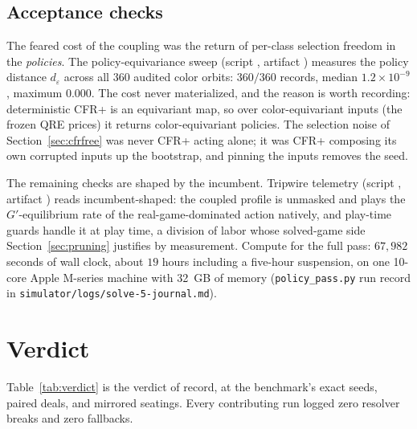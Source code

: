 \documentclass[11pt]{article}
\theoremstyle{plain}
\theoremstyle{definition}
\theoremstyle{remark}
\newcommand{\code}[1]{\texttt{\small #1}}
\newcommand{\gp}{\ensuremath{G'}}
\newcommand{\deps}{\ensuremath{d_\varepsilon}}
\begin{document}
\subsection{Acceptance checks}

The feared cost of the coupling was the return of per-class selection
freedom in the \emph{policies}. The policy-equivariance sweep (script
, artifact
) measures the policy
distance $\deps$ across all $360$ audited color orbits: $360/360$
records, median $1.2\times10^{-9}$, maximum $0.000$. The cost never
materialized, and the reason is worth recording: deterministic CFR+ is
an equivariant map, so over color-equivariant inputs (the frozen QRE
prices) it returns color-equivariant policies. The selection noise of
Section~\ref{sec:cfrfree} was never CFR+ acting alone; it was CFR+
composing its own corrupted inputs up the bootstrap, and pinning the
inputs removes the seed.

The remaining checks are shaped by the incumbent. Tripwire telemetry
(script , artifact
) reads incumbent-shaped: the
coupled profile is unmasked and plays the $\gp$-equilibrium rate of the
real-game-dominated action natively, and play-time guards handle it at
play time, a division of labor whose solved-game side
Section~\ref{sec:pruning} justifies by measurement. Compute for the full pass: $67{,}982$ seconds
of wall clock, about $19$ hours including a five-hour suspension, on
one 10-core Apple M-series machine with 32~GB of memory
(\code{policy\_pass.py} run record in
\code{simulator/logs/solve-5-journal.md}).

\section{Verdict}\label{sec:verdict}

Table~\ref{tab:verdict} is the verdict of record, at the benchmark's
exact seeds, paired deals, and mirrored seatings. Every contributing
run logged zero resolver breaks and zero fallbacks.
\end{document}
